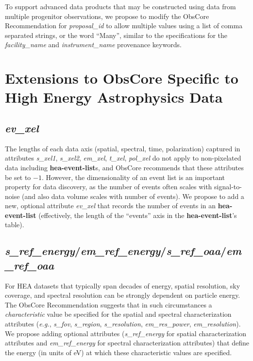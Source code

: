 \documentclass[11pt,a4paper]{ivoa}
\begin{document}
To support advanced data products that may be constructed using data from multiple progenitor observations, we propose to modify the ObsCore Recommendation for {\em proposal\_id\/} to allow multiple values using a list of comma separated strings, or the word ``Many'', similar to the specifications for the {\em facility\_name\/} and {\em instrument\_name\/} provenance keywords. 


\pagebreak
\section{Extensions to ObsCore Specific to High Energy Astrophysics Data}
\label{sec:obscoreext}

\subsection{{\em ev\_xel}}

The lengths of each data axis (spatial, spectral, time, polarization) captured in attributes {\em s\_xel1\/}, {\em s\_xel2\/}, {\em em\_xel\/}, {\em t\_xel\/}, {\em pol\_xel\/} do not apply to non-pixelated data including {\bf hea-event-list}s, and ObsCore recommends that these attributes be set to $-1$.  However, the dimensionality of an event list is an important property for data discovery, as the number of events often scales with signal-to-noise (and also data volume scales with number of events).  We propose to add a new, optional attribute {\em ev\_xel\/} that records the number of events in an {\bf hea-event-list} (effectively, the length of the ``events'' axis in the {\bf hea-event-list}'s table).

\subsection{{\em s\_ref\_energy\/}/{\em em\_ref\_energy\/}/{\em s\_ref\_oaa\/}/{\em em\_ref\_oaa}}

For \gls{HEA} datasets that typically span decades of energy, spatial resolution, sky coverage, and spectral resolution can be strongly dependent on particle energy. The ObsCore Recommendation suggests that in such circumstances a {\em characteristic\/} value be specified for the spatial and spectral characterization attributes ({\em e.g.\/}, {\em s\_fov\/}, {\em s\_region\/}, {\em s\_resolution\/}, {\em em\_res\_power\/}, {\em em\_resolution\/}). We propose adding optional attributes ({\em s\_ref\_energy\/} for spatial characterization attributes and {\em em\_ref\_energy\/} for spectral characterization attributes) that define the energy (in units of eV) at which these characteristic values are specified.
\end{document}
